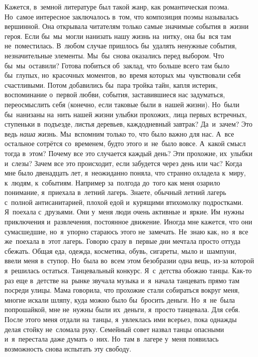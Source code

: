 \chaps{***}
\lettrine[lines=3, loversize=0.1]{К}{}ажется, в~земной литературе был такой жанр, как романтическая поэма.
Но~самое интересное заключалось в~том, что композиция поэмы называлась вершинной.
Она открывала читателям только самые значимые события в~жизни героя.
Если бы~мы~могли нанизать нашу жизнь на~нитку, она бы~вся там не~поместилась.
В~любом случае пришлось бы~удалять ненужные события, незначительные элементы.
Мы~бы~снова оказались перед выбором.
Что бы~мы~оставили? Готова побиться об~заклад, что больше всего там было бы~глупых, но~красочных моментов, во~время которых мы~чувствовали себя счастливыми.
Потом добавились бы~пара тройка тайн, капля истерик, воспоминание о~первой любви, события, заставившиеся нас задуматься, переосмыслить себя (конечно, если таковые были в~нашей жизни).
Но~были бы~нанизаны на~нить нашей жизни улыбки прохожих, лица первых встречных, ступеньки в~подъезде, листья деревьев, каждодневный завтрак? Да~и~зачем? Это ведь \textit{наша} жизнь.
Мы~вспомним только то, что было важно для нас.
А~все остальное сотрётся со~временем, будто этого и~не~было вовсе.
А~какой смысл тогда в~этом? Почему все это случается каждый день? Эти прохожие, их~улыбки и~слезы? Зачем все это происходит, если забудется через день или час?
\clearpage
\chaps{***} 
\lettrine[lines=3, loversize=0.1]{К}{}огда мне было двенадцать лет, я~неожиданно поняла, что странно охладела к~миру, к~людям, к~событиям.
Например за~полгода до~того как меня озарило понимание, я~приехала в~летний лагерь.
Знаете, обычный летний лагерь с~полной антисанитарией, плохой едой и~курящими втихомолку подростками.
Я~поехала с~друзьями.
Они у~меня люди очень активные и~яркие.
Им~нужны приключения и~развлечения, постоянное движение.
Иногда мне кажется, что они сумасшедшие, но~я~упорно стараюсь этого не~замечать.
Не~знаю как, но~я~все же~поехала в~этот лагерь.
Говорю сразу в~первые дни мечтала просто оттуда сбежать.
Общая еда, одежда, косметика, обувь, сигареты, мыло и~шампуни, ввели меня в~ступор.
Но~была во~всем этом безобразии одна вещь, из-за которой я~решилась остаться.
Танцевальный конкурс.
Я~с~детства обожаю танцы.
Как-то раз еще в~детстве на~рынке звучала музыка и~я~начала танцевать прямо там посреди улицы.
Мама говорила, что прохожие стали собираться вокруг меня, многие искали шляпу, куда можно было бы~бросить деньги.
Но~я~не~была попрошайкой, мне не~нужны были их~деньги, я~просто танцевала.
Для себя.
После этого меня отдали на~танцы, я~увлеклась ими всерьез, пока однажды делая стойку не~сломала руку.
Семейный совет назвал танцы опасными и~я~перестала даже думать о~них.
Но~там в~лагере у~меня появилась возможность снова испытать эту свободу.

